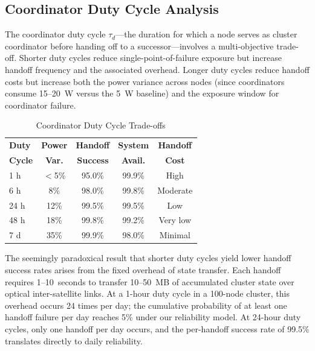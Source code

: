 \documentclass[journal]{IEEEtran}
\begin{document}
\subsection{Coordinator Duty Cycle Analysis}

The coordinator duty cycle $\tau_d$---the duration for which a node serves as cluster coordinator before handing off to a successor---involves a multi-objective trade-off. Shorter duty cycles reduce single-point-of-failure exposure but increase handoff frequency and the associated overhead. Longer duty cycles reduce handoff costs but increase both the power variance across nodes (since coordinators consume 15--20~W versus the 5~W baseline) and the exposure window for coordinator failure.

\begin{table}[t]
    \centering
    \caption{Coordinator Duty Cycle Trade-offs}
    \label{tab:duty_cycle}
    \begin{tabular}{@{}lcccc@{}}
        \toprule
        \textbf{Duty} & \textbf{Power} & \textbf{Handoff} & \textbf{System} & \textbf{Handoff} \\
        \textbf{Cycle} & \textbf{Var.} & \textbf{Success} & \textbf{Avail.} & \textbf{Cost} \\
        \midrule
        1 h   & $<$5\%  & 95.0\% & 99.9\% & High \\
        6 h   & 8\%     & 98.0\% & 99.8\% & Moderate \\
        24 h  & 12\%    & 99.5\% & 99.5\% & Low \\
        48 h  & 18\%    & 99.8\% & 99.2\% & Very low \\
        7 d   & 35\%    & 99.9\% & 98.0\% & Minimal \\
        \bottomrule
    \end{tabular}
\end{table}


The seemingly paradoxical result that shorter duty cycles yield lower handoff success rates arises from the fixed overhead of state transfer. Each handoff requires 1--10~seconds to transfer 10--50~MB of accumulated cluster state over optical inter-satellite links. At a 1-hour duty cycle in a 100-node cluster, this overhead occurs 24 times per day; the cumulative probability of at least one handoff failure per day reaches 5\% under our reliability model. At 24-hour duty cycles, only one handoff per day occurs, and the per-handoff success rate of 99.5\% translates directly to daily reliability.
\end{document}
